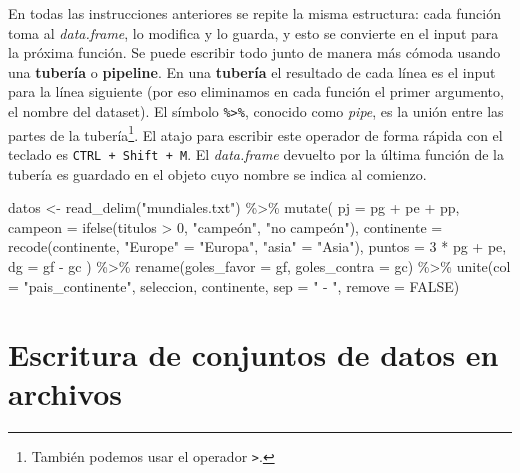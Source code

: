 \documentclass[
]{book}
\newenvironment{Shaded}{\begin{snugshade}}{\end{snugshade}}
\newcommand{\AttributeTok}[1]{\textcolor[rgb]{0.77,0.63,0.00}{#1}}
\newcommand{\ConstantTok}[1]{\textcolor[rgb]{0.00,0.00,0.00}{#1}}
\newcommand{\DecValTok}[1]{\textcolor[rgb]{0.00,0.00,0.81}{#1}}
\newcommand{\FunctionTok}[1]{\textcolor[rgb]{0.00,0.00,0.00}{#1}}
\newcommand{\NormalTok}[1]{#1}
\newcommand{\OtherTok}[1]{\textcolor[rgb]{0.56,0.35,0.01}{#1}}
\newcommand{\SpecialCharTok}[1]{\textcolor[rgb]{0.00,0.00,0.00}{#1}}
\newcommand{\StringTok}[1]{\textcolor[rgb]{0.31,0.60,0.02}{#1}}
\begin{document}
En todas las instrucciones anteriores se repite la misma estructura: cada función toma al \emph{data.frame}, lo modifica y lo guarda, y esto se convierte en el input para la próxima función. Se puede escribir todo junto de manera más cómoda usando una \textbf{tubería} o \textbf{pipeline}. En una \textbf{tubería} el resultado de cada línea es el input para la línea siguiente (por eso eliminamos en cada función el primer argumento, el nombre del dataset). El símbolo \texttt{\%\textgreater{}\%}, conocido como \emph{pipe}, es la unión entre las partes de la tubería\footnote{También podemos usar el operador \texttt{\textbar{}\textgreater{}}.}. El atajo para escribir este operador de forma rápida con el teclado es \texttt{CTRL\ +\ Shift\ +\ M}. El \emph{data.frame} devuelto por la última función de la tubería es guardado en el objeto cuyo nombre se indica al comienzo.

\begin{Shaded}
\begin{Highlighting}[]
\NormalTok{datos }\OtherTok{\textless{}{-}} 
    \FunctionTok{read\_delim}\NormalTok{(}\StringTok{"mundiales.txt"}\NormalTok{) }\SpecialCharTok{\%\textgreater{}\%} 
    \FunctionTok{mutate}\NormalTok{(}
        \AttributeTok{pj =}\NormalTok{ pg }\SpecialCharTok{+}\NormalTok{ pe }\SpecialCharTok{+}\NormalTok{ pp,}
        \AttributeTok{campeon =} \FunctionTok{ifelse}\NormalTok{(titulos }\SpecialCharTok{\textgreater{}} \DecValTok{0}\NormalTok{, }\StringTok{"campeón"}\NormalTok{, }\StringTok{"no campeón"}\NormalTok{),}
        \AttributeTok{continente =} \FunctionTok{recode}\NormalTok{(continente, }\StringTok{"Europe"} \OtherTok{=} \StringTok{"Europa"}\NormalTok{, }\StringTok{"asia"} \OtherTok{=} \StringTok{"Asia"}\NormalTok{),}
        \AttributeTok{puntos =} \DecValTok{3} \SpecialCharTok{*}\NormalTok{ pg }\SpecialCharTok{+}\NormalTok{ pe, }
        \AttributeTok{dg =}\NormalTok{ gf }\SpecialCharTok{{-}}\NormalTok{ gc}
\NormalTok{    ) }\SpecialCharTok{\%\textgreater{}\%} 
    \FunctionTok{rename}\NormalTok{(}\AttributeTok{goles\_favor =}\NormalTok{ gf, }\AttributeTok{goles\_contra =}\NormalTok{ gc) }\SpecialCharTok{\%\textgreater{}\%} 
    \FunctionTok{unite}\NormalTok{(}\AttributeTok{col =} \StringTok{"pais\_continente"}\NormalTok{, seleccion, continente, }\AttributeTok{sep =} \StringTok{" {-} "}\NormalTok{, }\AttributeTok{remove =} \ConstantTok{FALSE}\NormalTok{)}
\end{Highlighting}
\end{Shaded}

\hypertarget{escritura-de-conjuntos-de-datos-en-archivos}{%
\section{Escritura de conjuntos de datos en archivos}\label{escritura-de-conjuntos-de-datos-en-archivos}}
\end{document}
